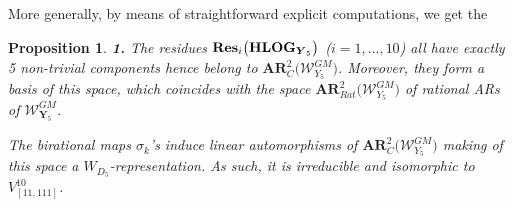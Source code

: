 \documentclass[11pt]{amsart}
\newtheorem{prop}[thm]{Proposition}
\begin{document}
More generally, by means of straightforward explicit computations, we get the 
\begin{prop}
{\bf 1.} The residues  ${\bf Res}_{i}\big( {\bf HLOG}_{ \boldsymbol{Y}_5}\big)$ ($i=1,\ldots,10$) all 
have exactly 5 non-trivial components hence 
belong to $\boldsymbol{AR}^2_C\Big( \boldsymbol{\mathcal W}_{Y_5}^{GM}\Big)$. Moreover, they form a  basis of this space, which coincides with the space 
$\boldsymbol{AR}^2_{Rat}\Big( \boldsymbol{\mathcal W}_{Y_5}^{GM}\Big)$ of rational ARs of  $\boldsymbol{\mathcal W}_{\boldsymbol{Y}_5}^{GM}$.

 The birational maps $\sigma_k$'s induce linear automorphisms of $\boldsymbol{AR}^2_C\Big( \boldsymbol{\mathcal W}_{Y_5}^{GM}\Big)$ making of this space a 
$W_{D_5}$-representation.  As such, it is irreducible and isomorphic to $V^{10}_{[11,111]}$. 
\end{prop}
\end{document}
